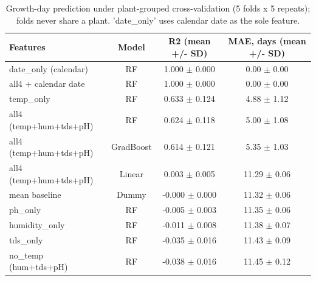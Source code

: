 \begin{table}[t]
\centering
\caption{Growth-day prediction under plant-grouped cross-validation (5 folds x 5 repeats); folds never share a plant. 'date\_only' uses calendar date as the sole feature.}
\label{tab:sensor-cv}
\begin{tabular}{lccc}
\toprule
Features & Model & R2 (mean +/- SD) & MAE, days (mean +/- SD) \\
\midrule
date\_only (calendar) & RF & 1.000 $\pm$ 0.000 & 0.00 $\pm$ 0.00 \\
all4 + calendar date & RF & 1.000 $\pm$ 0.000 & 0.00 $\pm$ 0.00 \\
temp\_only & RF & 0.633 $\pm$ 0.124 & 4.88 $\pm$ 1.12 \\
all4 (temp+hum+tds+pH) & RF & 0.624 $\pm$ 0.118 & 5.00 $\pm$ 1.08 \\
all4 (temp+hum+tds+pH) & GradBoost & 0.614 $\pm$ 0.121 & 5.35 $\pm$ 1.03 \\
all4 (temp+hum+tds+pH) & Linear & 0.003 $\pm$ 0.005 & 11.29 $\pm$ 0.06 \\
mean baseline & Dummy & -0.000 $\pm$ 0.000 & 11.32 $\pm$ 0.06 \\
ph\_only & RF & -0.005 $\pm$ 0.003 & 11.35 $\pm$ 0.06 \\
humidity\_only & RF & -0.011 $\pm$ 0.008 & 11.38 $\pm$ 0.07 \\
tds\_only & RF & -0.035 $\pm$ 0.016 & 11.43 $\pm$ 0.09 \\
no\_temp (hum+tds+pH) & RF & -0.038 $\pm$ 0.016 & 11.45 $\pm$ 0.12 \\
\bottomrule
\end{tabular}
\end{table}